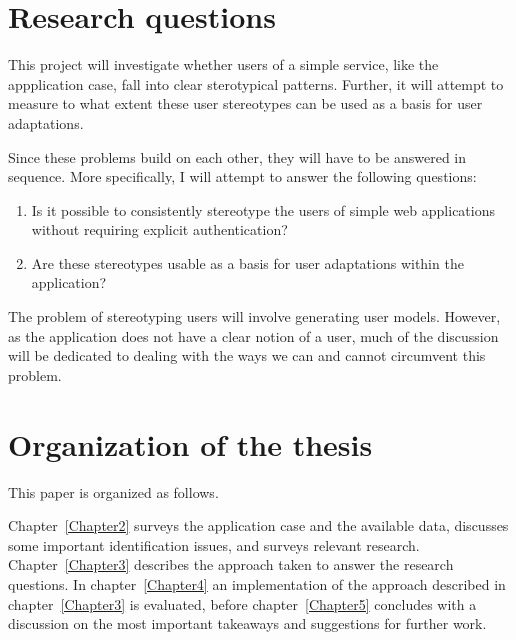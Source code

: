\section{Research questions}
\label{intro:research_questions}

  This project will investigate whether users of a simple service, like the appplication case, fall into clear sterotypical patterns. Further, it will attempt to measure to what extent these user stereotypes can be used as a basis for user adaptations.

  Since these problems build on each other, they will have to be answered in sequence. More specifically, I will attempt to answer the following questions:

  \begin{enumerate}
    \item Is it possible to consistently stereotype the users of simple web applications without requiring explicit authentication?
    \item Are these stereotypes usable as a basis for user adaptations within the application?
  \end{enumerate}

  The problem of stereotyping users will involve generating user models. However, as the application does not have a clear notion of a user, much of the discussion will be dedicated to dealing with the ways we can and cannot circumvent this problem.

\section{Organization of the thesis}
\label{intro:thesis_organization}

  This paper is organized as follows.

  Chapter~\ref{Chapter2} surveys the application case and the available data, discusses some important identification issues, and surveys relevant research.
  Chapter~\ref{Chapter3} describes the approach taken to answer the research questions.
  In chapter~\ref{Chapter4} an implementation of the approach described in chapter~\ref{Chapter3} is evaluated, before chapter~\ref{Chapter5} concludes with a discussion on the most important takeaways and suggestions for further work.
